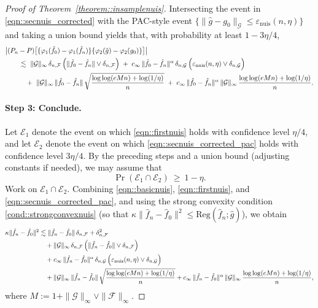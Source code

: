 \documentclass[11pt]{article}
\newcommand{\Reg}{\mathrm{Reg}}
\theoremstyle{plain}
\theoremstyle{definition} %
\begin{document}
\begin{proof}[Proof of Theorem~\ref{theorem::insamplenuis}]
 

Intersecting the event in \eqref{eqn::secnuis_corrected} with the PAC-style event
$\{\|\hat g-g_0\|_{\mathcal G}\le \varepsilon_{\mathrm{nuis}}(n,\eta)\}$ and taking a union bound yields that,
with probability at least $1-3\eta/4$,
\begin{align}
\label{eqn::secnuis_corrected_pac}
&\bigl|(P_n-P)\bigl[\{\varphi_1(\hat f_0)-\varphi_1(\hat f_n)\}\{\varphi_2(\hat g)-\varphi_2(g_0)\}\bigr]\bigr|
\nonumber\\
&\qquad\lesssim\ 
\|\mathcal G\|_\infty\,
\delta_{n,\mathcal F}\,
\Bigl(\|\hat f_0-\hat f_n\|\vee \delta_{n,\mathcal F}\Bigr)
\;+\;
c_\infty\,
\|\hat f_0-\hat f_n\|^{\alpha}\,
\delta_{n,\mathcal G}\,
\Bigl(\varepsilon_{\mathrm{nuis}}(n,\eta)\vee \delta_{n,\mathcal G}\Bigr)
\nonumber\\
&\qquad\quad+\ 
\|\mathcal G\|_\infty\,
\|\hat f_0-\hat f_n\|\,
\sqrt{\frac{\log\log(eMn)+\log(1/\eta)}{n}}
\;+\;
c_\infty\,
\|\hat f_0-\hat f_n\|^{\alpha}\,\|\mathcal G\|_\infty\,
\frac{\log\log(eMn)+\log(1/\eta)}{n}.
\end{align}
\paragraph{Step 3: Conclude.}
Let $\mathcal E_1$ denote the event on which \eqref{eqn::firstnuis} holds with confidence level $\eta/4$, and let $\mathcal E_2$ denote the event on which \eqref{eqn::secnuis_corrected_pac} holds with confidence level $3\eta/4$.
By the preceding steps and a union bound (adjusting constants if needed), we may assume that
\[
\Pr(\mathcal E_1\cap \mathcal E_2)\ \ge\ 1-\eta.
\]
Work on $\mathcal E_1\cap \mathcal E_2$. Combining \eqref{eqn::basicnuis}, \eqref{eqn::firstnuis}, and \eqref{eqn::secnuis_corrected_pac}, and using the strong convexity condition \eqref{cond::strongconvexnuis} (so that $\kappa\|\hat f_n-\hat f_0\|^2\le \Reg(\hat f_n;\hat g)$), we obtain
\begin{align}
\label{eqn::step3_start}
\kappa\|\hat f_n-\hat f_0\|^2
&\lesssim
\|\hat f_n-\hat f_0\|\,\delta_{n,\mathcal F}
+\delta_{n,\mathcal F}^2
\nonumber\\
&\quad+
\|\mathcal G\|_\infty\,
\delta_{n,\mathcal F}\,
\Bigl(\|\hat f_n-\hat f_0\|\vee \delta_{n,\mathcal F}\Bigr)
\nonumber\\
&\quad+
c_\infty\,
\|\hat f_n-\hat f_0\|^{\alpha}\,
\delta_{n,\mathcal G}\,
\Bigl(\varepsilon_{\mathrm{nuis}}(n,\eta)\vee \delta_{n,\mathcal G}\Bigr)
\nonumber\\
&\quad+
\|\mathcal G\|_\infty\,
\|\hat f_n-\hat f_0\|\,
\sqrt{\frac{\log\log(eMn)+\log(1/\eta)}{n}}
+
c_\infty\,
\|\hat f_n-\hat f_0\|^{\alpha}\,\|\mathcal G\|_\infty\,
\frac{\log\log(eMn)+\log(1/\eta)}{n},
\end{align}
where $M:=1+\|\mathcal G\|_\infty\vee \|\mathcal F\|_\infty$.


\end{proof}
\end{document}
